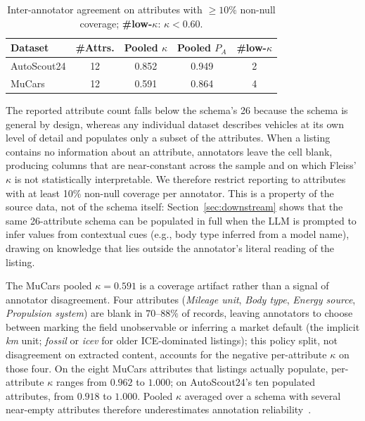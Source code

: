 \documentclass[conference]{IEEEtran}
\begin{document}
\begin{table}[htbp]
\caption{Inter-annotator agreement on attributes with $\geq 10\%$
non-null coverage; \textbf{\#low-$\kappa$}: $\kappa < 0.60$.}
\begin{center}
\footnotesize
\setlength{\tabcolsep}{6pt}
\begin{tabular}{|l|c|c|c|c|}
\hline
\textbf{Dataset} & \textbf{\#Attrs.}
                 & \textbf{Pooled $\kappa$}
                 & \textbf{Pooled $P_A$}
                 & \textbf{\#low-$\kappa$} \\
\hline
AutoScout24 & 12 & 0.852 & 0.949 & 2 \\
MuCars      & 12 & 0.591 & 0.864 & 4 \\
\hline
\end{tabular}
\label{tab:iaa}
\end{center}
\end{table}

The reported attribute count falls below the schema's 26 because
the schema is general by design, whereas any individual dataset
describes vehicles at its own level of detail and populates only a
subset of the attributes. When a listing contains no information
about an attribute, annotators leave the cell blank, producing
columns that are near-constant across the sample and on which
Fleiss' $\kappa$ is not statistically interpretable. We therefore
restrict reporting to attributes with at least 10\% non-null
coverage per annotator. This is a property of the source data, not
of the schema itself: Section~\ref{sec:downstream} shows that the
same 26-attribute schema can be populated in full when the LLM is
prompted to infer values from contextual cues (e.g., body type
inferred from a model name), drawing on knowledge that lies outside
the annotator's literal reading of the listing.

The MuCars pooled $\kappa = 0.591$ is a coverage artifact rather
than a signal of annotator disagreement. Four attributes
(\textit{Mileage unit}, \textit{Body type}, \textit{Energy source},
\textit{Propulsion system}) are blank in $70$--$88\%$ of records,
leaving annotators to choose between marking the field unobservable
or inferring a market default (the implicit \textit{km} unit;
\textit{fossil} or \textit{icev} for older ICE-dominated listings);
this policy split, not disagreement on extracted content, accounts
for the negative per-attribute $\kappa$ on those four. On the eight
MuCars attributes that listings actually populate, per-attribute
$\kappa$ ranges from $0.962$ to $1.000$; on AutoScout24's ten
populated attributes, from $0.918$ to $1.000$. Pooled $\kappa$
averaged over a schema with several near-empty attributes therefore
underestimates annotation reliability~\cite{artstein2008interagreement}.
\end{document}
